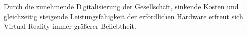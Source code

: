 Durch die zunehmende Digitalisierung der Gesellschaft, sinkende Kosten und gleichzeitig steigende Leistungsf\"ahigkeit der erfordlichen Hardware erfreut sich Virtual Reality immer gr\"oßerer Beliebtheit.
